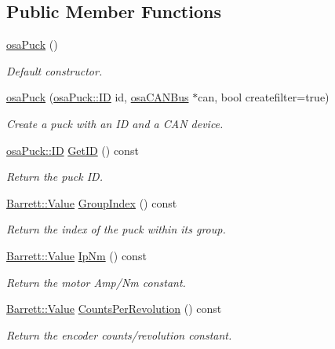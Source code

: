 \subsection*{Public Member Functions}
\begin{DoxyCompactItemize}
\item 
\hyperlink{classosa_puck_a48e807c1fc536f0ee1ae2683b497898d}{osa\+Puck} ()
\begin{DoxyCompactList}\small\item\em Default constructor. \end{DoxyCompactList}\item 
\hyperlink{classosa_puck_a6359231c1e52328b83d362b7599adebd}{osa\+Puck} (\hyperlink{classosa_puck_aa484456bae759574accdc76fe68b4685}{osa\+Puck\+::\+I\+D} id, \hyperlink{classosa_c_a_n_bus}{osa\+C\+A\+N\+Bus} $\ast$can, bool createfilter=true)
\begin{DoxyCompactList}\small\item\em Create a puck with an I\+D and a C\+A\+N device. \end{DoxyCompactList}\item 
\hyperlink{classosa_puck_aa484456bae759574accdc76fe68b4685}{osa\+Puck\+::\+I\+D} \hyperlink{classosa_puck_a9b9e0f8cc240cafbaee88a4cb25028e6}{Get\+I\+D} () const 
\begin{DoxyCompactList}\small\item\em Return the puck I\+D. \end{DoxyCompactList}\item 
\hyperlink{struct_barrett_a57ff132885344ca62e4b4b691885685b}{Barrett\+::\+Value} \hyperlink{classosa_puck_acc4f438b1a7d4b8d6f12ebb981c3591e}{Group\+Index} () const 
\begin{DoxyCompactList}\small\item\em Return the index of the puck within its group. \end{DoxyCompactList}\item 
\hyperlink{struct_barrett_a57ff132885344ca62e4b4b691885685b}{Barrett\+::\+Value} \hyperlink{classosa_puck_ad7455cc914b716961b282f5f7f887b51}{Ip\+Nm} () const 
\begin{DoxyCompactList}\small\item\em Return the motor Amp/\+Nm constant. \end{DoxyCompactList}\item 
\hyperlink{struct_barrett_a57ff132885344ca62e4b4b691885685b}{Barrett\+::\+Value} \hyperlink{classosa_puck_ae4999be0a82215645fcd400264aa0f19}{Counts\+Per\+Revolution} () const 
\begin{DoxyCompactList}\small\item\em Return the encoder counts/revolution constant. \end{DoxyCompactList}\item 

\end{DoxyCompactItemize}
